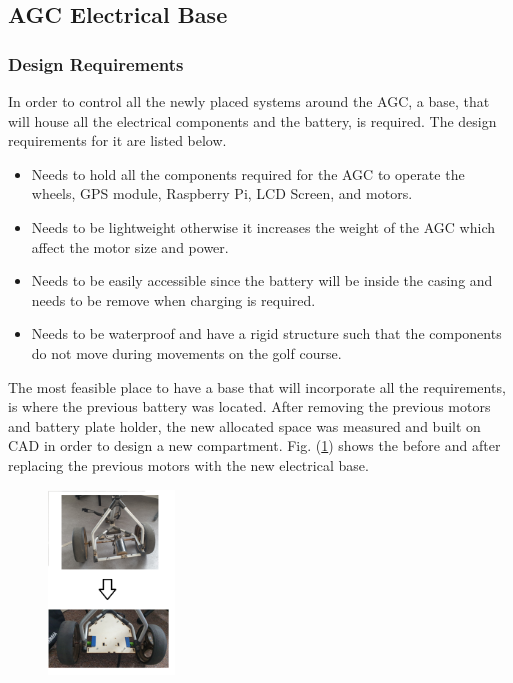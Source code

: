 \documentclass[11pt,landscape]{article}
\begin{document}
\begin{multicols}{3}
\subsection{AGC Electrical Base}
\subsubsection{Design Requirements}
In order to control all the newly placed systems around the AGC, a base, that
will house all the electrical components and the battery, is required. The
design requirements for it are listed below.
\begin{itemize}
    \item Needs to hold all the components required for the AGC to operate
    the wheels, GPS module, Raspberry Pi, LCD Screen, and motors.
    \item Needs to be lightweight otherwise it increases the weight of the
    AGC which affect the motor size and power. 
    \item Needs to be easily accessible since the battery will be inside the
    casing and needs to be remove when charging is required.
    \item Needs to be waterproof and have a rigid structure such that the
    components do not move during movements on the golf course.
\end{itemize}
The most feasible place to have a base that will incorporate all the
requirements, is where the previous battery was located. After removing the
previous motors and battery plate holder, the new allocated space was measured
and built on CAD in order to design a new compartment. Fig.
(\ref{fig:prev_base}) shows the before and after replacing the previous motors
with the new electrical base.

\begin{figure}[H]
    \begin{center}
        \includegraphics[width=0.3\textwidth]{Prev AGC base.png}
        \label{fig:prev_base}
    \end{center}
\end{figure}


\end{multicols}
\end{document}
